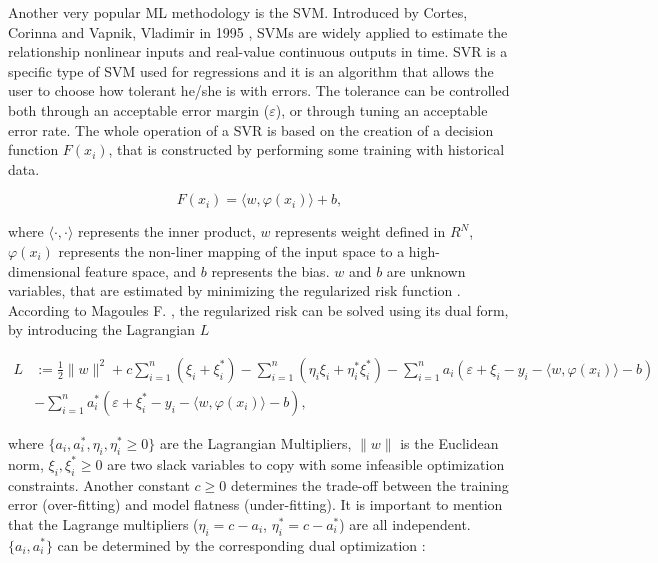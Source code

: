 Another very popular \ac{ML} methodology is the \ac{SVM}. Introduced by Cortes, Corinna and Vapnik, Vladimir in 1995 \cite{svm1}, \ac{SVM}s are widely applied to estimate the relationship nonlinear inputs and real-value continuous outputs in time. \ac{SVR} is a specific type of \ac{SVM} used for regressions and it is an algorithm that allows the user to choose how tolerant he/she is with errors. The tolerance can be controlled both through an acceptable error margin ($\varepsilon$), or through tuning an acceptable error rate. The whole operation of a \ac{SVR} is based on the creation of a decision function $F(x_i)$, that is constructed by performing some training with historical data.

\begin{equation}
   F(x_i) = \langle w, \varphi(x_i) \rangle + b,
   \label{svmdec}
\end{equation}

where $\langle\cdot,\cdot\rangle$ represents the inner product, $w$ represents weight defined in $R^N$, $\varphi(x_i)$ represents the non-liner mapping of the input space to a high-dimensional feature space, and $b$ represents the bias\cite{svm2}. $w$ and $b$ are unknown variables, that are estimated by minimizing the regularized risk function \cite{svm2}. According to Magoules F. \cite{ann1}, the regularized risk can be solved using its dual form, by introducing the Lagrangian $L$

\begin{equation}
\begin{split}
       L & := \frac{1}{2}\parallel w \parallel^2 + c \sum_{i=1}^{n}(\xi_i + \xi_i^*) - \sum_{i=1}^{n}(\eta_i\xi_i + \eta_i^*\xi_i^*) - \sum_{i=1}^{n}a_i(\varepsilon + \xi_i - y_i- \langle w, \varphi(x_i) \rangle - b) \\ 
         & - \sum_{i=1}^{n}a_i^*(\varepsilon + \xi_i^* - y_i- \langle w, \varphi(x_i) \rangle - b),
\end{split}
\end{equation}

where $\{a_i, a_i^*, \eta_i, \eta_i^*\geq 0\}$ are the Lagrangian Multipliers, $\parallel w \parallel$ is the Euclidean norm, ${{\xi_i,\xi_i^*\geq 0}}$ are two slack variables to copy with some infeasible optimization constraints\cite{review2017}. Another constant $c \geq 0$ determines the trade-off between the training error (over-fitting) and model flatness (under-fitting)\cite{review2017}. 
It is important to mention that the Lagrange multipliers ($\eta_i = c - a_i$, $\eta_i^* = c-a_i^*$) are all independent. $\{a_i, a_i^*\}$ can be determined by the corresponding dual optimization \cite{ann1}:

